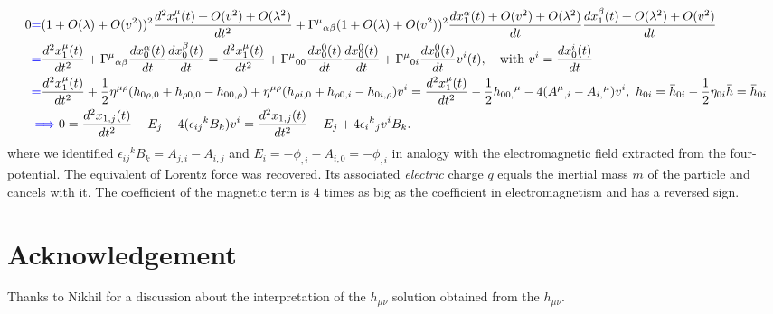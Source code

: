 \documentclass[10pt, a4paper]{article}
\begin{document}
\begin{enumerate}
  \begin{align*}
    0
    &\textcolor{blue}{=} (1 + O(\lambda) + O(v^2))^2 \frac{d^2 x_1^{\mu}(t) + O(v^2) + O(\lambda^2)}{dt^2} + \Gamma^{\mu}{}_{\alpha \beta} (1 + O(\lambda) + O(v^2))^2\frac{dx_1^\alpha(t) + O(v^2) + O(\lambda^2)}{dt} \frac{dx_1^\beta(t)+O(\lambda^2) + O(v^2)}{dt}\\
    &\textcolor{blue}{=} \frac{d^2 x_1^{\mu}(t)}{dt^2} + \Gamma^{\mu}{}_{\alpha \beta} \frac{dx_0^\alpha(t)}{dt} \frac{dx_0^\beta(t)}{dt} =  \frac{d^2 x_1^{\mu}(t)}{dt^2} + \Gamma^{\mu}{}_{00} \frac{dx_0^0(t)}{dt} \frac{dx_0^0(t)}{dt} + \Gamma^{\mu}{}_{0i} \frac{dx_0^0(t)}{dt} v^i(t), \quad \text{with $v^i = \frac{dx_0^i(t)}{dt}$}\\
    &\textcolor{blue}{=} \frac{d^2 x_1^{\mu}(t)}{dt^2} + \dfrac{1}{2}\eta^{\mu \rho}(h_{0 \rho, 0}+h_{\rho 0, 0}-h_{0 0, \rho}) + \eta^{\mu \rho}(h_{\rho i, 0}+h_{\rho 0, i}-h_{0 i, \rho})v^i = \frac{d^2 x_1^{\mu}(t)}{dt^2} - \dfrac{1}{2}h_{0 0,} {}^\mu -4 (A^{\mu}{}_{, i}-A_{i,}{}^{\mu
    })v^i, \,\, h_{0i} = \bar{h}_{0i} - \frac{1}{2}\eta_{0i}\bar{h} = \bar{h}_{0i} \\
    &\textcolor{blue}{\implies} 0 = \frac{d^2 x_{1, j}(t)}{dt^2} - E_j - 4(\epsilon_{ij}{}^k B_k)v^i = \frac{d^2 x_{1, j}(t)}{dt^2} - E_j + 4 \epsilon_i {}^k{}_{j} v^i B_k.
  \end{align*}
  where we identified $\epsilon_{ij}{}^k B_k = A_{j, i}-A_{i, j}$ and $E_i = -\phi_{, i} - A_{i, 0} = -\phi_{, i} $ in analogy with the electromagnetic field extracted from the four-potential. The equivalent of Lorentz force was recovered. Its associated \textit{electric} charge $q$ equals the inertial mass $m$ of the particle and cancels with it. The coefficient of the magnetic term is $4$ times as big as the coefficient in electromagnetism and has a reversed sign.  
\end{enumerate}

\section{Acknowledgement}
Thanks to Nikhil for a discussion about the interpretation of the $h_{\mu\nu}$ solution obtained from the $\bar{h}_{\mu\nu}$.



\makereferences


\end{document}

